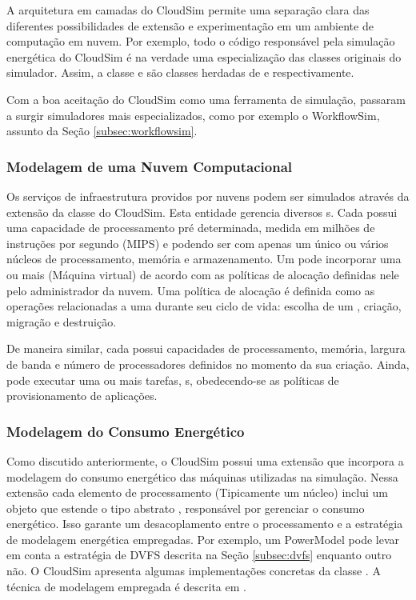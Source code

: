 A arquitetura em camadas do CloudSim permite uma separação clara das diferentes
possibilidades de extensão e experimentação em um ambiente de computação em nuvem.
Por exemplo, todo o código responsável pela simulação energética do CloudSim
é na verdade uma especialização das classes originais do simulador. Assim,
a classe  e  são classes herdadas de
 e  respectivamente.

Com a boa aceitação do CloudSim como uma ferramenta de simulação, passaram a 
surgir simuladores mais especializados, como por exemplo o WorkflowSim, assunto
da Seção \ref{subsec:workflowsim}.

\subsubsection{Modelagem de uma Nuvem Computacional}

Os serviços de infraestrutura providos por nuvens podem ser simulados através 
da extensão da classe  do CloudSim. Esta entidade gerencia
diversos s. Cada  possui uma capacidade de processamento 
pré determinada, medida em milhões de instruções por segundo (MIPS) e podendo 
ser com apenas um único ou vários núcleos de processamento, memória e
armazenamento. Um  pode incorporar uma ou mais  (Máquina virtual)
de acordo com as políticas de alocação definidas nele pelo administrador da nuvem.
Uma política de alocação é definida como as operações relacionadas a uma
 durante seu ciclo de vida: escolha de um , criação, 
migração e destruição.

De maneira similar, cada  possui capacidades de processamento, memória,
largura de banda e número de processadores definidos no momento da sua criação.
Ainda, pode executar uma ou mais tarefas, s, obedecendo-se as
políticas de provisionamento de aplicações.

\subsubsection{Modelagem do Consumo Energético}
Como discutido anteriormente, o CloudSim possui uma extensão que incorpora 
a modelagem do consumo energético das máquinas utilizadas na simulação. Nessa 
extensão cada elemento de processamento (Tipicamente um núcleo) inclui um
objeto que estende o tipo abstrato , responsável por gerenciar o
consumo energético. Isso garante um desacoplamento entre o processamento e 
a estratégia de modelagem energética empregadas. Por exemplo,
um PowerModel pode levar em conta a estratégia de DVFS descrita na Seção 
\ref{subsec:dvfs} enquanto outro não. O CloudSim apresenta algumas implementações
concretas da classe . A técnica de modelagem empregada é descrita
em \cite{beloglazov:cloudsim_power}.



